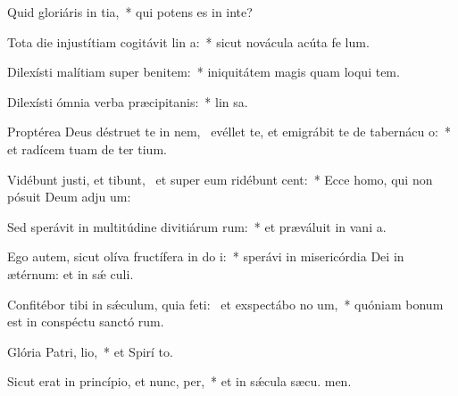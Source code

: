 \item Quid gloriáris in tia,~* qui potens es in inte?
\item Tota die injustítiam cogitávit lin a:~* sicut novácula acúta fe lum.
\item Dilexísti malítiam super benitem:~* iniquitátem magis quam loqui tem.
\item Dilexísti ómnia verba præcipitanis:~* lin sa.
\item Proptérea Deus déstruet te in nem,~\pscross{} evéllet te, et emigrábit te de tabernácu o:~* et radícem tuam de ter tium.
\item Vidébunt justi, et tibunt,~\pscross{} et super eum ridébunt  cent:~* Ecce homo, qui non pósuit Deum adju um:
\item Sed sperávit in multitúdine divitiárum rum:~* et præváluit in vani a.
\item Ego autem, sicut olíva fructífera in do i:~* sperávi in misericórdia Dei in ætérnum: et in sǽ culi.
\item Confitébor tibi in sǽculum, quia feti:~\pscross{} et exspectábo no um,~* quóniam bonum est in conspéctu sanctó rum.
\item Glória Patri,  lio,~* et Spirí to.
\item Sicut erat in princípio, et nunc,  per,~* et in sǽcula sæcu. men.
